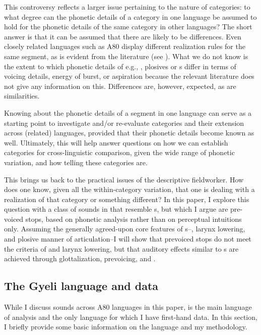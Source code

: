 \documentclass[output=paper]{LSP/langsci}
\begin{document}
This controversy reflects a larger issue pertaining to the nature of categories: to what degree can the phonetic details of a category in one language be assumed to hold for the phonetic details of the same category in other languages?  The short answer is that it can be assumed that there are likely to be differences.  Even closely related languages such as  A80 display different realization rules for the same segment, as is evident from the literature (see ). What we do not know is the extent to which phonetic details of e.g., , plosives or s differ in terms of voicing details, energy of burst, or aspiration because the relevant literature does not give any information on this. Differences are, however, expected, as are similarities.

Knowing about the phonetic details of a segment in one language can serve as a starting point to investigate and/or re-evaluate categories and their extension across (related) languages, provided that their phonetic details become known as well. Ultimately, this will help answer questions on how we can establish categories for cross-linguistic comparison, given the wide range of phonetic variation, and how telling these categories are.

This brings us back to the practical issues of the descriptive fieldworker. How does one know, given all the within-category variation, that one is dealing with a realization of that category or something  different? In this paper, I explore this question with a class of sounds in  that resemble s, but which I argue are pre-voiced stops, based on phonetic analysis rather than on perceptual intuitions only. Assuming the generally agreed-upon core features of s--, larynx lowering, and plosive manner of articulation--I will show that  prevoiced stops do not meet the criteria of  and larynx lowering, but that auditory effects similar to s are achieved through glottalization, prevoicing, and .






\subsection{The Gyeli language and data}
\label{sec:grimm:1.2}

While I discuss  sounds across  A80 languages in this paper,  is the main language of analysis and the only language for which I have first-hand data. In this section, I briefly provide some basic information on the language and my methodology.
   
\end{document}
